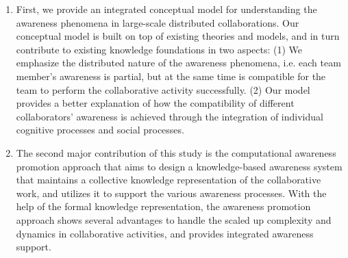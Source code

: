 \begin{enumerate}
	\item First, we provide an integrated conceptual model for understanding the awareness phenomena in large-scale distributed collaborations. Our conceptual model is built on top of existing theories and models, and in turn contribute to existing knowledge foundations in two aspects: (1) We emphasize the distributed nature of the awareness phenomena, i.e. each team member's awareness is partial, but at the same time is compatible for the team to perform the collaborative activity successfully. (2) Our model provides a better explanation of how the compatibility of different collaborators' awareness is achieved through the integration of individual cognitive processes and social processes.
	\item The second major contribution of this study is the computational awareness promotion approach that aims to design a knowledge-based awareness system that maintains a collective knowledge representation of the collaborative work, and utilizes it to support the various awareness processes. With the help of the formal knowledge representation, the awareness promotion approach shows several advantages to handle the scaled up complexity and dynamics in collaborative activities, and provides integrated awareness support.
\end{enumerate}
